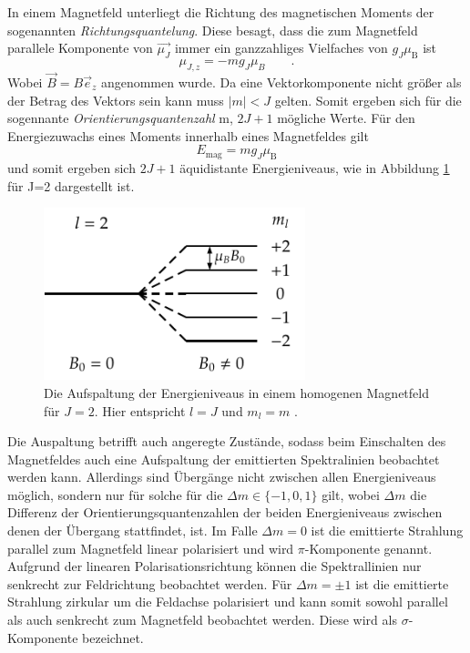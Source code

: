 In einem Magnetfeld unterliegt die Richtung des magnetischen Moments der sogenannten \textit{Richtungsquantelung}. Diese besagt, dass die zum Magnetfeld parallele Komponente von $\vec{\mu_J}$ immer ein ganzzahliges Vielfaches von $g_J\mu_{\text{B}}$ ist
\begin{equation}
\mu_{J,z}= -m g_J\mu_B \qquad .
\end{equation}
Wobei $\vec{B}=B\vec{e}_z$ angenommen wurde.
Da eine Vektorkomponente nicht größer als der Betrag des Vektors sein kann muss $|m|< J$ gelten. Somit ergeben sich für die sogennante \textit{Orientierungsquantenzahl} m, $2J+1$ mögliche Werte.
Für den Energiezuwachs eines Moments innerhalb eines Magnetfeldes gilt
\begin{equation}
E_\text{mag} = mg_J\mu_\text{B}
\end{equation}
und somit ergeben sich $2J+1$ äquidistante Energieniveaus, wie in Abbildung \ref{fig:tfig2} für J=2 dargestellt ist.

\begin{figure}
\centering
\includegraphics[height=5.0cm]{zeeman-effekt_2.pdf}
\caption{Die Aufspaltung der Energieniveaus in einem homogenen Magnetfeld für $J=2$. Hier entspricht $l=J$ und $m_l=m$ \cite{quelle04}.}
\label{fig:tfig2}
\end{figure}

Die Auspaltung betrifft auch angeregte Zustände, sodass beim Einschalten des Magnetfeldes auch eine Aufspaltung der emittierten Spektralinien beobachtet werden kann. Allerdings sind Übergänge nicht zwischen allen 
Energieniveaus möglich, sondern nur für solche für die $\Delta m \in \{-1, 0, 1\}$ gilt, wobei $\Delta m$ die Differenz der Orientierungsquantenzahlen der beiden Energieniveaus zwischen denen der Übergang stattfindet, ist.
Im Falle $\Delta m = 0$ ist die emittierte Strahlung parallel zum Magnetfeld linear polarisiert und wird $\pi$-Komponente genannt. Aufgrund der linearen Polarisationsrichtung können die Spektrallinien nur senkrecht zur Feldrichtung
beobachtet werden. Für $\Delta m = \pm 1$ ist die emittierte Strahlung zirkular um die Feldachse polarisiert und kann somit sowohl parallel als auch senkrecht zum Magnetfeld beobachtet werden. Diese wird als $\sigma$-Komponente bezeichnet.

